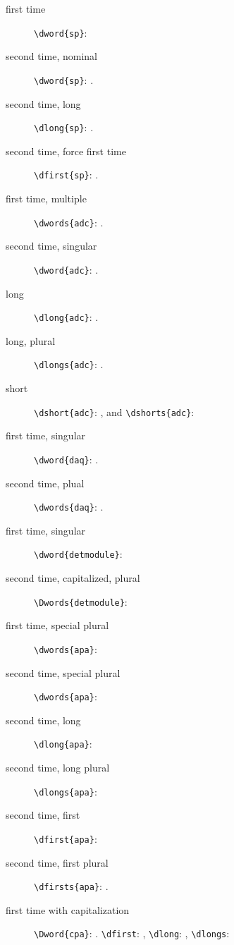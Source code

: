 \documentclass{article}
\begin{document}
\begin{description}

\item[first time] \verb|\dword{sp}|: 

\item[second time, nominal] \verb|\dword{sp}|: .

\item[second time, long] \verb|\dlong{sp}|: .

\item[second time, force first time] \verb|\dfirst{sp}|: .

\item[first time, multiple] \verb|\dwords{adc}|: .

\item[second time, singular] \verb|\dword{adc}|: .

\item[long] \verb|\dlong{adc}|: .

\item[long, plural] \verb|\dlongs{adc}|: .

\item[short] \verb|\dshort{adc}|: , and \verb|\dshorts{adc}|: 

\item[first time, singular] \verb|\dword{daq}|: .

\item[second time, plual] \verb|\dwords{daq}|: .

\item[first time, singular] \verb|\dword{detmodule}|: 

\item[second time, capitalized, plural] \verb|\Dwords{detmodule}|: 

\item[first time, special plural] \verb|\dwords{apa}|: 

\item[second time, special plural] \verb|\dwords{apa}|: 

\item[second time, long] \verb|\dlong{apa}|: 

\item[second time, long plural] \verb|\dlongs{apa}|: 

\item[second time, first] \verb|\dfirst{apa}|: 

\item[second time, first plural] \verb|\dfirsts{apa}|: .

\item[first time with capitalization] \verb|\Dword{cpa}|: . \verb|\dfirst|: , \verb|\dlong|: , \verb|\dlongs|: 

\end{description}
\end{document}
